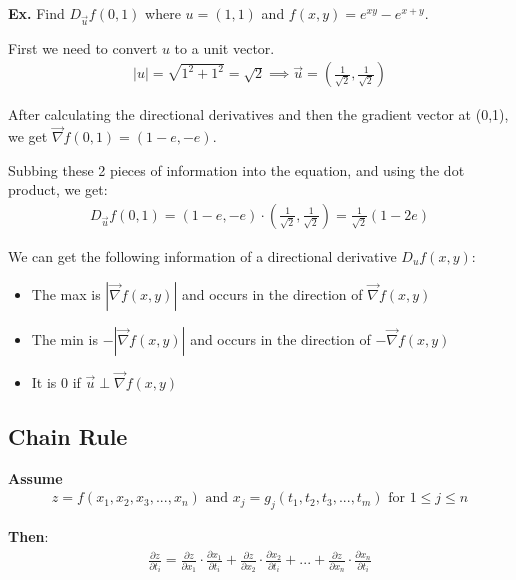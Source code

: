 \documentclass[12pt,letterpaper]{article} \usepackage{amsmath} \usepackage{graphicx}  \usepackage{longtable}  \usepackage{amssymb}
\begin{document}
        \begin{mdframed}
            \textbf{Ex. } Find $D_{\vec{u}} f(0,1)$ where $u = (1,1)$ and $f(x,y)=e^{xy}-e^{x+y}$.

            First we need to convert $u$ to a unit vector. 
            \begin{align*}
                |u| = \sqrt{1^2 + 1^2} = \sqrt{2} \implies \vec{u} = \left(\frac{1}{\sqrt{2}}, \frac{1}{\sqrt{2}}\right)
            \end{align*}

            After calculating the directional derivatives and then the gradient vector at (0,1), we get $\vec{\nabla}f(0,1) = (1-e, -e)$.

            Subbing these 2 pieces of information into the equation, and using the dot product, we get:
            \begin{align*}
                D_{\vec{u}}f(0,1) = (1-e, -e)\cdot \left(\frac{1}{\sqrt{2}}, \frac{1}{\sqrt{2}}\right) = \frac{1}{\sqrt{2}}(1-2e)
            \end{align*}
        \end{mdframed}

        We can get the following information of a directional derivative $D_{u} f(x,y)$:
        \begin{itemize}[noitemsep]
            \item The max is $|\vec{\nabla}f(x,y)|$ and occurs in the direction of $\vec{\nabla}f(x,y)$
            \item The min is $-|\vec{\nabla}f(x,y)|$ and occurs in the direction of $-\vec{\nabla}f(x,y)$
            \item It is $0$ if $\vec{u} \perp \vec{\nabla} f(x,y)$
        \end{itemize}

        \subsection{Chain Rule}
        \textbf{Assume} 
        \begin{align*}
            z=f(x_1, x_2, x_3, ..., x_n) \text{ and } x_j = g_j(t_1, t_2, t_3, ..., t_m) \text{ for } 1\le j\le n
        \end{align*}
        
        \textbf{Then}:
        \begin{align*}
            \frac{\partial z}{\partial t_i} = \frac{\partial z}{\partial x_1}\cdot \frac{\partial x_1}{\partial t_i} + \frac{\partial z}{\partial x_2}\cdot \frac{\partial x_2}{\partial t_i} + ... + \frac{\partial z}{\partial x_n}\cdot \frac{\partial x_n}{\partial t_i}
        \end{align*}
\end{document}

